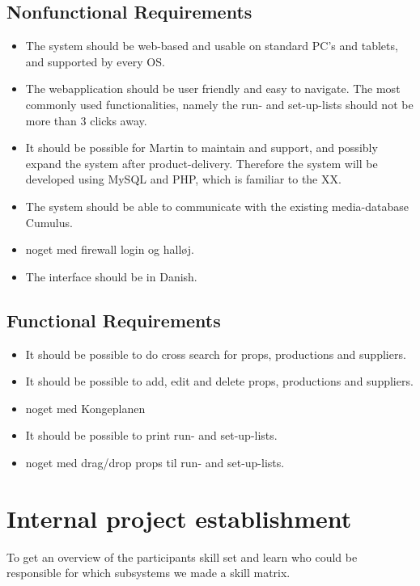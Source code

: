 \documentclass[12pt]{article}
\begin{document}
\subsection{Nonfunctional Requirements}
\begin{itemize}
\item The system should be web-based and usable on standard PC's and tablets, and supported by every OS.
\item The webapplication should be user friendly and easy to navigate. The most commonly used functionalities, namely the run- and set-up-lists should not be more than 3 clicks away.
\item It should be possible for Martin to maintain and support, and possibly expand the system after product-delivery. Therefore the system will be developed using MySQL and PHP, which is familiar to the XX.
\item The system should be able to communicate with the existing media-database Cumulus.
\item noget med firewall login og halløj.
\item The interface should be in Danish.
\end{itemize}
\subsection{Functional Requirements}
\begin{itemize}
\item It should be possible to do cross search for props, productions and suppliers.
\item It should be possible to add, edit and delete props, productions and suppliers.
\item noget med Kongeplanen
\item It should be possible to print run- and set-up-lists.
\item noget med drag/drop props til run- and set-up-lists.
\end{itemize}
\section{Internal project establishment}
To get an overview of the participants skill set and learn who could be responsible for which subsystems we made a skill matrix.\\
\end{document}

